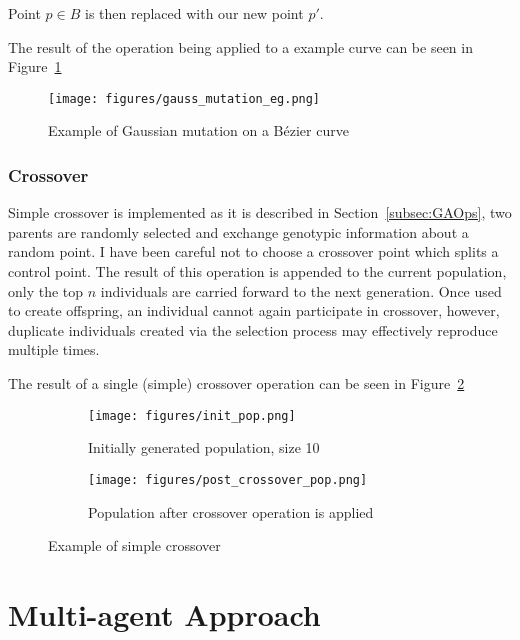 Point $p \in B$ is then replaced with our new point $p'$.

The result of the operation being applied to a example curve can be seen in Figure~\ref{fig:gauss_mutation_eg}


\begin{figure}[ht]
  \centering
  \texttt{[image: figures/gauss\_mutation\_eg.png]}
  \caption{\label{fig:gauss_mutation_eg} Example of Gaussian mutation on a Bézier curve}
\end{figure}

\subsubsection{Crossover}

Simple crossover is implemented as it is described in Section~\ref{subsec:GAOps}, two parents are randomly selected and exchange genotypic information about a random point. I have been careful not to choose a crossover point which splits a control point. The result of this operation is appended to the current population, only the top $n$ individuals are carried forward to the next generation.
Once used to create offspring, an individual cannot again participate in crossover, however, duplicate individuals created via the selection process may effectively reproduce multiple times.

The result of a single (simple) crossover operation can be seen in Figure~\ref{fig:crossover_eg}

\begin{figure}
  \centering
  \begin{subfigure}[b]{0.44\textwidth}
    \centering
    \texttt{[image: figures/init\_pop.png]}
    \caption{Initially generated population, size 10}
  \end{subfigure}
  \begin{subfigure}[b]{0.44\textwidth}
    \centering
    \texttt{[image: figures/post\_crossover\_pop.png]}
    \caption{Population after crossover operation is applied}
  \end{subfigure}
  \caption{\label{fig:crossover_eg} Example of simple crossover}
\end{figure}

\section{Multi-agent Approach}
\label{sec:maa}

